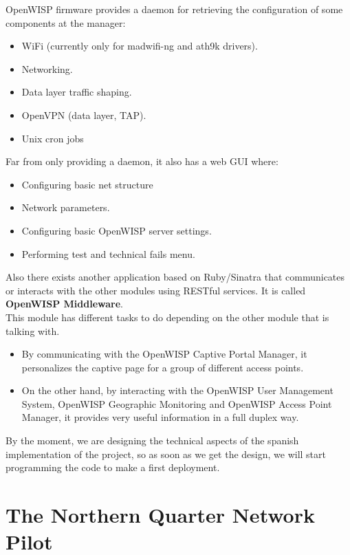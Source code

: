 \documentclass[draftclsnofoot,12pt,journal,onecolumn]{IEEEtran}
\begin{document}
\begin{enumerate}
OpenWISP firmware provides a daemon for retrieving the configuration of some components at the manager:

\begin{itemize}
\item WiFi (currently only for madwifi-ng and ath9k drivers).
\item Networking.
\item Data layer traffic shaping.
\item OpenVPN (data layer, TAP).
\item Unix cron jobs
\end{itemize}

Far from only providing a daemon, it also has a web GUI where:
\begin{itemize}
\item Configuring basic net structure
\item Network parameters.
\item Configuring basic OpenWISP server settings.
\item Performing test and technical fails menu.
\end{itemize}

\end{enumerate}

Also there exists another application based on Ruby/Sinatra that communicates or interacts with the other modules using RESTful services. It is called \textbf{OpenWISP Middleware}.\\This module has different tasks to do depending on the other module that is talking with.

\begin{itemize}

\item By communicating with the OpenWISP Captive Portal Manager, it personalizes the captive page for a group of different access points.\item On the other hand, by interacting with the OpenWISP User Management System, OpenWISP Geographic Monitoring and OpenWISP Access Point Manager, it provides very useful information in a full duplex way.

\end{itemize}

By the moment, we are designing the technical aspects of the spanish implementation of the project, so as soon as we get the design, we will start programming the code to make a first deployment.



\section{The Northern Quarter Network Pilot}
\label{sec:nqn}
\end{document}
